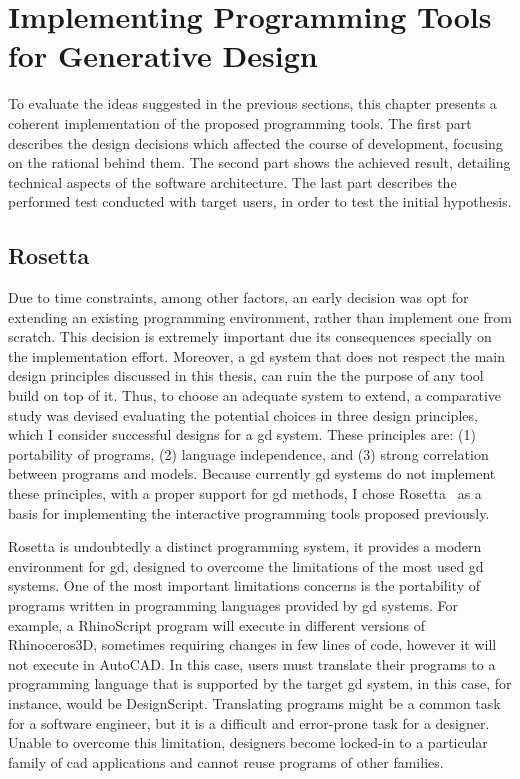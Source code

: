 
\chapter{Implementing Programming Tools for Generative Design}
\label{chapter:evaluation}

To evaluate the ideas suggested in the previous sections, this chapter presents a coherent implementation of the proposed programming tools. The first part describes the design decisions which affected the course of development, focusing on the rational behind them. The second part shows the achieved result, detailing technical aspects of the software architecture. The last part describes the performed test conducted with target users, in order to test the initial hypothesis.

\section{Rosetta}

Due to time constraints, among other factors, an early decision was opt for extending an existing programming environment, rather than implement one from scratch. This decision is extremely important due its consequences specially on the implementation effort. Moreover, a \gls{gd} system that does not respect the main design principles discussed in this thesis, can ruin the the purpose of any tool build on top of it. Thus, to choose an adequate system to extend,
a comparative study was devised evaluating the potential choices in three design principles, which I consider successful designs for a \gls{gd} system. These principles are: (1) portability of programs, (2) language independence, and (3) strong correlation between programs and models. Because currently \gls{gd} systems do not implement these principles, with a proper support for \gls{gd} methods, I chose Rosetta~\citep{lopes2011portable} as a basis for implementing the interactive programming tools proposed previously.

Rosetta is undoubtedly a distinct programming system, it provides a modern environment for \gls{gd}, designed to overcome the limitations of the most used \gls{gd} systems. One of the most important limitations concerns is the portability of programs written in programming languages provided by \gls{gd} systems. For example, a RhinoScript program will execute in different versions of Rhinoceros3D, sometimes requiring changes in few lines of code, however it will not execute in AutoCAD. In this case, users must translate their programs to a programming language that is supported by the target \gls{gd} system, in this case, for instance, would be DesignScript. Translating programs might be a common task for a software engineer, but it is a difficult and error-prone task for a designer. Unable to overcome this limitation, designers become locked-in to a particular family of \gls{cad} applications and cannot reuse programs of other families.

